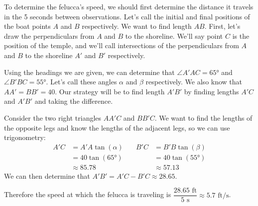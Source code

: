 \documentclass[main]{subfiles}
\begin{document}
\begin{enumerate}
  \begin{solution}
    To determine the felucca's speed, we should first determine the distance
    it travels in the 5 seconds between observations. Let's call the initial
    and final positions of the boat points $A$ and $B$ respectively. We want to
    find length $AB$. First, let's draw the perpendiculars from $A$ and $B$ to the shoreline. We'll say point $C$ is the position of the temple, and we'll call
    intersections of the perpendiculars from $A$ and $B$ to the shoreline $A'$ and
    $B'$ respectively.
    
    \begin{center}
    \end{center}

    Using the headings we are given, we can determine that  $\angle{A'AC}=\ang{65}$
    and $\angle{B'BC}=\ang{55}$. Let's call these angles $\alpha$ and $\beta$ respectively. We also know that $AA'=BB'=40$. Our strategy will
    be to find length $A'B'$ by finding lengths $A'C$ and $A'B'$ and taking the
    difference.

    Consider the two right triangles $AA'C$ and $BB'C$. We want to find the lengths
    of the opposite legs and know the lengths of the adjacent legs, so we can use
    trigonometry:
    \begin{align*}
        A'C &= A'A \tan(\alpha) \quad & B'C &= B'B \tan(\beta) \\
        &= 40 \tan(\ang{65}) &&= 40 \tan(\ang{55}) \\
        &\approx 85.78 &&\approx 57.13
    \end{align*}
    We can then determine that $A'B'=A'C-B'C\approx28.65$.
    
    Therefore the speed at which the felucca is traveling is $\dfrac{28.65\text{ ft}}
    {5\text{ s}}\approx5.7\text{ ft/s}$.
  \end{solution}

\end{enumerate}
\end{document}
